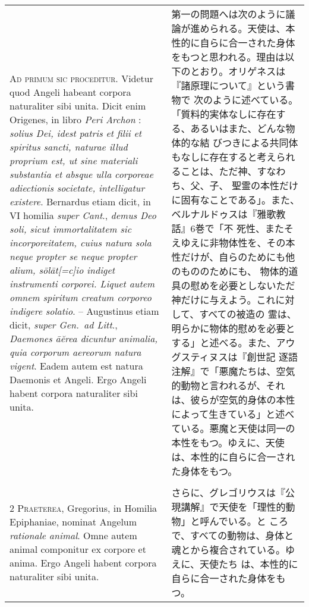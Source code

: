 \documentclass[10pt]{jsarticle} %
\begin{document}
\begin{longtable}{p{21em}p{21em}}


{\huge A}{\scshape d primum sic proceditur}. Videtur quod Angeli habeant corpora
naturaliter sibi unita. Dicit enim Origenes, in libro {\itshape Peri Archon} :
{\itshape solius Dei, idest patris et filii et spiritus sancti, naturae illud
proprium est, ut sine materiali substantia et absque ulla corporeae adiectionis
societate, intelligatur existere}. Bernardus etiam dicit, in VI homilia
{\itshape super Cant}., {\itshape demus Deo soli, sicut immortalitatem sic
incorporeitatem, cuius natura sola neque propter se neque propter alium,
s\={o}l\={a}t[=c]io indiget instrumenti corporei. Liquet autem omnem spiritum
creatum corporeo indigere solatio}. -- Augustinus etiam dicit, {\itshape super
Gen.~ad Litt}., {\itshape Daemones \={a}\u{e}rea dicuntur animalia, quia
corporum aereorum natura vigent}. Eadem autem est natura Daemonis et
Angeli. Ergo Angeli habent corpora naturaliter sibi unita.


&

 第一の問題へは次のように議論が進められる。天使は、本性的に自らに合一された身体
をもつと思われる。理由は以下のとおり。オリゲネスは『諸原理について』という書物で
次のように述べている。「質料的実体なしに存在する、あるいはまた、どんな物体的な結
びつきによる共同体もなしに存在すると考えられることは、ただ神、すなわち、父、子、
聖霊の本性だけに固有なことである」。また、ベルナルドゥスは『雅歌教話』6巻で「不
死性、またそえゆえに非物体性を、その本性だけが、自らのためにも他のもののためにも、
物体的道具の慰めを必要としないただ神だけに与えよう。これに対して、すべての被造の
霊は、明らかに物体的慰めを必要とする」と述べる。また、アウグスティヌスは『創世記
逐語注解』で「悪魔たちは、空気的動物と言われるが、それは、彼らが空気的身体の本性
によって生きている」と述べている。悪魔と天使は同一の本性をもつ。ゆえに、天使
は、本性的に自らに合一された身体をもつ。

\\\\


{\scshape 2 Praeterea}, Gregorius, in Homilia
Epiphaniae, nominat Angelum {\itshape rationale animal}. Omne autem animal
componitur ex corpore et anima. Ergo Angeli habent corpora naturaliter
sibi unita.


&

さらに、グレゴリウスは『公現講解』で天使を「理性的動物」と呼んでいる。と
 ころで、すべての動物は、身体と魂とから複合されている。ゆえに、天使たち
 は、本性的に自らに合一された身体をもつ。



\end{longtable}
\end{document}
